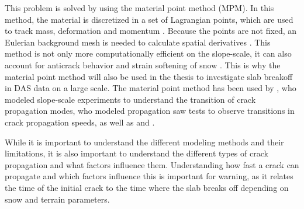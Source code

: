 \documentclass[10pt]{article}
\begin{document}
This problem is solved by using the material point method (MPM). In this method, the material is discretized in a set of Lagrangian points, which are used to track mass, deformation and momentum \parencite{bardenhagenMaterialpointMethodGranular2000}. Because the points are not fixed, an Eulerian background mesh is needed to calculate spatial derivatives \parencite{bardenhagenMaterialpointMethodGranular2000}. This method is not only more computationally efficient on the slope-scale, it can also account for anticrack behavior and strain softening of snow \parencite{gaumeInvestigatingReleaseFlow2019}. This is why the material point method will also be used in the thesis to investigate slab breakoff in DAS data on a large scale. The material point method has been used by \cite{bergfeldSignaturesSubRayleighSupershear2025}, who modeled slope-scale experiments to understand the transition of crack propagation modes, \cite{trottetTransitionSubRayleighAnticrack2022} who modeled propagation saw tests to observe transitions in crack propagation speeds, as well as \cite{gaumeInvestigatingReleaseFlow2019} and \cite{gaumeDynamicAnticrackPropagation2018}. \par


  
  While it is important to understand the different modeling methods and their limitations, it is also important to understand the different types of crack propagation and what factors influence them. Understanding how fast a crack can propagate and which factors influence this is important for warning, as it relates the time of the initial crack to the time where the slab breaks off depending on snow and terrain parameters.  \par
\end{document}
